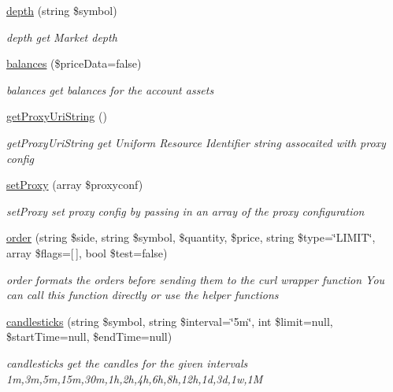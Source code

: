 \begin{DoxyCompactItemize}
\hyperlink{classBinance_1_1API_ac36901dbea220b2401786a6d1bc4d051}{depth} (string \$symbol)
\begin{DoxyCompactList}\small\item\em depth get Market depth \end{DoxyCompactList}\item 
\hyperlink{classBinance_1_1API_afe968feb47f5b68853dae571cb75800c}{balances} (\$price\-Data=false)
\begin{DoxyCompactList}\small\item\em balances get balances for the account assets \end{DoxyCompactList}\item 
\hyperlink{classBinance_1_1API_af1d41534a9f67bc74a6133efa2df4df7}{get\-Proxy\-Uri\-String} ()
\begin{DoxyCompactList}\small\item\em get\-Proxy\-Uri\-String get Uniform Resource Identifier string assocaited with proxy config \end{DoxyCompactList}\item 
\hyperlink{classBinance_1_1API_a3647415e517c745a35d2d54bb27575fe}{set\-Proxy} (array \$proxyconf)
\begin{DoxyCompactList}\small\item\em set\-Proxy set proxy config by passing in an array of the proxy configuration \end{DoxyCompactList}\item 
\hyperlink{classBinance_1_1API_a40e8ddf7280b33b1899f59d0f16e5fa0}{order} (string \$side, string \$symbol, \$quantity, \$price, string \$type=\char`\"{}L\-I\-M\-I\-T\char`\"{}, array \$flags=\mbox{[}$\,$\mbox{]}, bool \$test=false)
\begin{DoxyCompactList}\small\item\em order formats the orders before sending them to the curl wrapper function You can call this function directly or use the helper functions \end{DoxyCompactList}\item 
\hyperlink{classBinance_1_1API_a8273c4cc5c3226aa46e5aee6a69a58aa}{candlesticks} (string \$symbol, string \$interval=\char`\"{}5m\char`\"{}, int \$limit=null, \$start\-Time=null, \$end\-Time=null)
\begin{DoxyCompactList}\small\item\em candlesticks get the candles for the given intervals 1m,3m,5m,15m,30m,1h,2h,4h,6h,8h,12h,1d,3d,1w,1\-M \end{DoxyCompactList}\item 

\end{DoxyCompactItemize}
